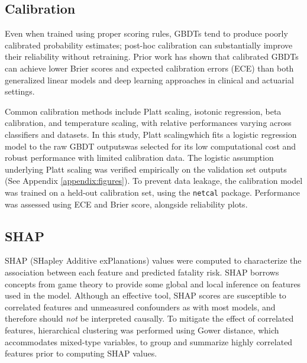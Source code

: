 \documentclass{article}
\begin{document}
\subsection{Calibration}
Even when trained using proper scoring rules, GBDTs tend to produce poorly calibrated probability estimates; post-hoc calibration can substantially improve their reliability without retraining.\cite{Caruana2006} Prior work has shown that calibrated GBDTs can achieve lower Brier scores and expected calibration errors (ECE) than both generalized linear models and deep learning approaches in clinical and actuarial settings.\cite{Alabi2025-ct, fonseca2017calibrationmachinelearningclassifiers}

Common calibration methods include Platt scaling, isotonic regression, beta calibration, and temperature scaling, with relative performances varying across classifiers and datasets.\cite{manokhin2026classifiercalibrationscaleempirical} In this study, Platt scaling\textemdash which fits a logistic regression model to the raw GBDT outputs\textemdash was selected for its low computational cost and robust performance with limited calibration data.\cite{guo2017calibrationmodernneuralnetworks, pmlr-v54-kull17a, Boken2021-ug}
The logistic assumption underlying Platt scaling was verified empirically on the validation set outputs (See Appendix \ref{appendix:figures}). To prevent data leakage, the calibration model was trained on a held-out calibration set, using the \texttt{netcal} package. Performance was assessed using ECE and Brier score, alongside reliability plots.

\subsection{SHAP}
SHAP (SHapley Additive exPlanations) values were computed to characterize the association between each feature and predicted fatality risk.\cite{lundberg2017unifiedapproachinterpretingmodel} SHAP borrows concepts from game theory to provide some global and local inference on features used in the model. Although an effective tool, SHAP scores are susceptible to correlated features and unmeasured confounders as with most models, and therefore should \textit{not} be interpreted causally. To mitigate the effect of correlated features, hierarchical clustering was performed using Gower distance, which accommodates mixed-type variables, to group and summarize highly correlated features prior to computing SHAP values.
\end{document}
